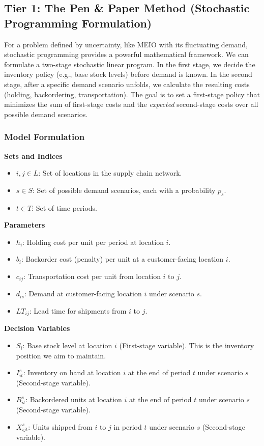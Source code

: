 \documentclass{article}
\begin{document}
\subsection{Tier 1: The Pen \& Paper Method (Stochastic Programming Formulation)}

For a problem defined by uncertainty, like MEIO with its fluctuating demand, stochastic programming provides a powerful mathematical framework. We can formulate a two-stage stochastic linear program. In the first stage, we decide the inventory policy (e.g., base stock levels) before demand is known. In the second stage, after a specific demand scenario unfolds, we calculate the resulting costs (holding, backordering, transportation). The goal is to set a first-stage policy that minimizes the sum of first-stage costs and the \emph{expected} second-stage costs over all possible demand scenarios.

\subsubsection{Model Formulation}
\textbf{Sets and Indices}
\begin{itemize}
    \item $i, j \in L$: Set of locations in the supply chain network.
    \item $s \in S$: Set of possible demand scenarios, each with a probability $p_s$.
    \item $t \in T$: Set of time periods.
\end{itemize}

\textbf{Parameters}
\begin{itemize}
    \item $h_i$: Holding cost per unit per period at location $i$.
    \item $b_i$: Backorder cost (penalty) per unit at a customer-facing location $i$.
    \item $c_{ij}$: Transportation cost per unit from location $i$ to $j$.
    \item $d_{is}$: Demand at customer-facing location $i$ under scenario $s$.
    \item $LT_{ij}$: Lead time for shipments from $i$ to $j$.
\end{itemize}

\textbf{Decision Variables}
\begin{itemize}
    \item $S_i$: Base stock level at location $i$ (First-stage variable). This is the inventory position we aim to maintain.
    \item $I_{it}^s$: Inventory on hand at location $i$ at the end of period $t$ under scenario $s$ (Second-stage variable).
    \item $B_{it}^s$: Backordered units at location $i$ at the end of period $t$ under scenario $s$ (Second-stage variable).
    \item $X_{ijt}^s$: Units shipped from $i$ to $j$ in period $t$ under scenario $s$ (Second-stage variable).
\end{itemize}
\end{document}
